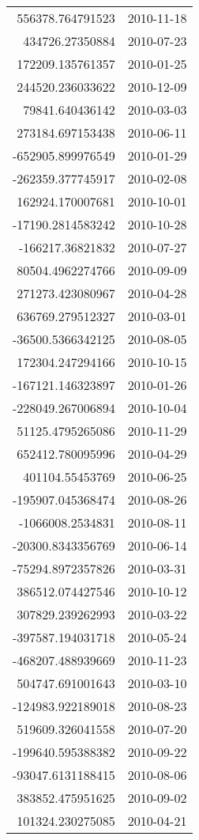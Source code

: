 \begin{tabular}{r | l}
556378.764791523 & 2010-11-18 \\
434726.27350884 & 2010-07-23 \\
172209.135761357 & 2010-01-25 \\
244520.236033622 & 2010-12-09 \\
79841.640436142 & 2010-03-03 \\
273184.697153438 & 2010-06-11 \\
-652905.899976549 & 2010-01-29 \\
-262359.377745917 & 2010-02-08 \\
162924.170007681 & 2010-10-01 \\
-17190.2814583242 & 2010-10-28 \\
-166217.36821832 & 2010-07-27 \\
80504.4962274766 & 2010-09-09 \\
271273.423080967 & 2010-04-28 \\
636769.279512327 & 2010-03-01 \\
-36500.5366342125 & 2010-08-05 \\
172304.247294166 & 2010-10-15 \\
-167121.146323897 & 2010-01-26 \\
-228049.267006894 & 2010-10-04 \\
51125.4795265086 & 2010-11-29 \\
652412.780095996 & 2010-04-29 \\
401104.55453769 & 2010-06-25 \\
-195907.045368474 & 2010-08-26 \\
-1066008.2534831 & 2010-08-11 \\
-20300.8343356769 & 2010-06-14 \\
-75294.8972357826 & 2010-03-31 \\
386512.074427546 & 2010-10-12 \\
307829.239262993 & 2010-03-22 \\
-397587.194031718 & 2010-05-24 \\
-468207.488939669 & 2010-11-23 \\
504747.691001643 & 2010-03-10 \\
-124983.922189018 & 2010-08-23 \\
519609.326041558 & 2010-07-20 \\
-199640.595388382 & 2010-09-22 \\
-93047.6131188415 & 2010-08-06 \\
383852.475951625 & 2010-09-02 \\
101324.230275085 & 2010-04-21 \\

\end{tabular}
